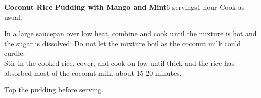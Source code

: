 \documentclass[../Cookbook.tex]{subfiles}
\begin{document}
\begin{recipe}[CoconutRicePudding]{\textbf{Coconut Rice Pudding with Mango and Mint}}{6 servings}{1 hour}
	Cook as usual.

	In a large saucepan over low heat, combine and cook until the mixture is hot and the sugar is dissolved. Do not let the mixture boil as the coconut milk could curdle. \\
	Stir in the cooked rice, cover, and cook on low until thick and the rice has absorbed most of the coconut milk, about 15-20 minutes.

	Top the pudding before serving.
\end{recipe}
\end{document}

